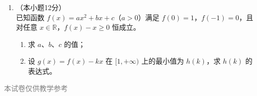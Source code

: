 \documentclass[12pt, a4paper]{ctexart}
\begin{document}
\begin{enumerate}[resume]
\vspace{7cm}

\item[22.]（本小题12分）\\
已知函数 $f(x)=ax^2+bx+c$（$a>0$）满足 $f(0)=1$，$f(-1)=0$，且对任意 $x\in\mathbb{R}$，$f(x)-x\geq 0$ 恒成立。
\begin{enumerate}[(1)]
  \item 求 $a$、$b$、$c$ 的值；
  \item 设 $g(x)=f(x)-kx$ 在 $[1,+\infty)$ 上的最小值为 $h(k)$，求 $h(k)$ 的表达式。
\end{enumerate}

\vspace{7cm}
\end{enumerate}

\vfill
\begin{center}
\small\textcolor{gray}{本试卷仅供教学参考}
\end{center}
\end{document}

